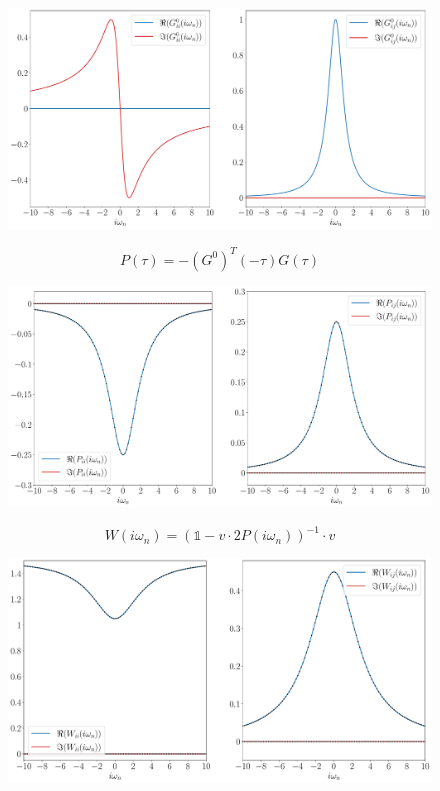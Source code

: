 \documentclass[12pt]{article}
\begin{document}
\begin{figure}[h!]
\center
\includegraphics[scale=0.45]{G0.pdf}
\end{figure}
\begin{equation}
P(\tau)=-(G^0)^T(-\tau)G(\tau)	
\end{equation}
\begin{figure}[h!]
\center
\includegraphics[scale=0.45]{P.pdf}
\end{figure}
\newpage
\noindent
\begin{equation}
W(i\omega_n)=(\mathbb{1}-v\cdot2P(i\omega_n))^{-1}\cdot v
\end{equation}
\begin{figure}[h!]
\center
\includegraphics[scale=0.45]{W.pdf}
\end{figure}
\end{document}
